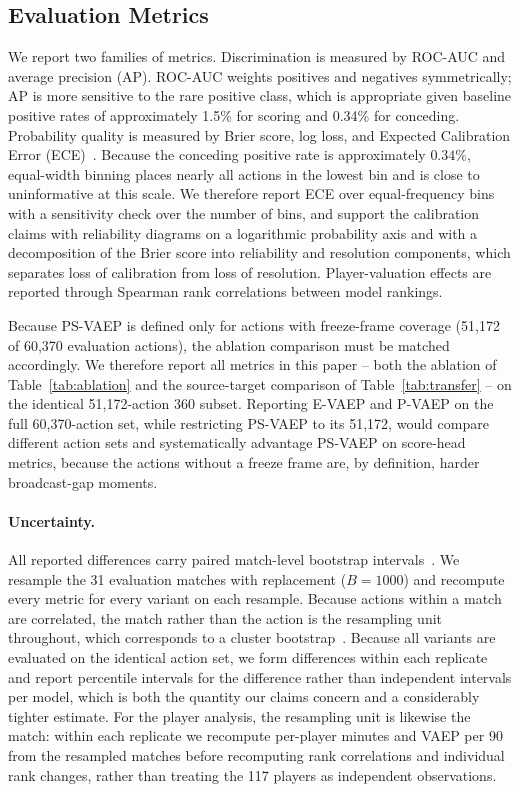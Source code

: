 \documentclass[runningheads]{llncs}
\begin{document}
\subsection{Evaluation Metrics}

We report two families of metrics. Discrimination is measured by ROC-AUC and average precision (AP). ROC-AUC weights positives and negatives symmetrically; AP is more sensitive to the rare positive class, which is appropriate given baseline positive rates of approximately 1.5\% for scoring and 0.34\% for conceding. Probability quality is measured by Brier score, log loss, and Expected Calibration Error (ECE)~\cite{guo2017calibration}. Because the conceding positive rate is approximately $0.34\%$, equal-width binning places nearly all actions in the lowest bin and is close to uninformative at this scale. We therefore report ECE over equal-frequency bins with a sensitivity check over the number of bins, and support the calibration claims with reliability diagrams on a logarithmic probability axis and with a decomposition of the Brier score into reliability and resolution components, which separates loss of calibration from loss of resolution. Player-valuation effects are reported through Spearman rank correlations between model rankings.

Because PS-VAEP is defined only for actions with freeze-frame coverage (51{,}172 of 60{,}370 evaluation actions), the ablation comparison must be matched accordingly. We therefore report all metrics in this paper -- both the ablation of Table~\ref{tab:ablation} and the source-target comparison of Table~\ref{tab:transfer} -- on the identical 51{,}172-action 360 subset. Reporting E-VAEP and P-VAEP on the full 60{,}370-action set, while restricting PS-VAEP to its 51{,}172, would compare different action sets and systematically advantage PS-VAEP on score-head metrics, because the actions without a freeze frame are, by definition, harder broadcast-gap moments.

\paragraph{\textbf{Uncertainty.}}
All reported differences carry paired match-level bootstrap intervals~\cite{efron1993bootstrap}. We resample the 31 evaluation matches with replacement ($B = 1000$) and recompute every metric for every variant on each resample. Because actions within a match are correlated, the match rather than the action is the resampling unit throughout, which corresponds to a cluster bootstrap~\cite{field2007bootstrapping}. Because all variants are evaluated on the identical action set, we form differences within each replicate and report percentile intervals for the difference rather than independent intervals per model, which is both the quantity our claims concern and a considerably tighter estimate. For the player analysis, the resampling unit is likewise the match: within each replicate we recompute per-player minutes and VAEP per 90 from the resampled matches before recomputing rank correlations and individual rank changes, rather than treating the 117 players as independent observations.
\end{document}
